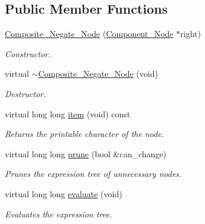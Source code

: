 \subsection*{Public Member Functions}
\begin{DoxyCompactItemize}
\item 
\hyperlink{classMadara_1_1Expression__Tree_1_1Composite__Negate__Node_a13d46a6fdcd4a5cab6b809a1220185a8}{Composite\_\-Negate\_\-Node} (\hyperlink{classMadara_1_1Expression__Tree_1_1Component__Node}{Component\_\-Node} $\ast$right)
\begin{DoxyCompactList}\small\item\em Constructor. \item\end{DoxyCompactList}\item 
virtual \hyperlink{classMadara_1_1Expression__Tree_1_1Composite__Negate__Node_aafcb6076aee4526c38b831458c3f8616}{$\sim$Composite\_\-Negate\_\-Node} (void)
\begin{DoxyCompactList}\small\item\em Destructor. \item\end{DoxyCompactList}\item 
virtual long long \hyperlink{classMadara_1_1Expression__Tree_1_1Composite__Negate__Node_a2d8c2d077cf8775ea7c31f897f522b02}{item} (void) const 
\begin{DoxyCompactList}\small\item\em Returns the printable character of the node. \item\end{DoxyCompactList}\item 
virtual long long \hyperlink{classMadara_1_1Expression__Tree_1_1Composite__Negate__Node_ad1cf0eb41e1b962483cd07a6cffa49cf}{prune} (bool \&can\_\-change)
\begin{DoxyCompactList}\small\item\em Prunes the expression tree of unnecessary nodes. \item\end{DoxyCompactList}\item 
virtual long long \hyperlink{classMadara_1_1Expression__Tree_1_1Composite__Negate__Node_a6f7fc2d58f7d2258766a8384557bac72}{evaluate} (void)
\begin{DoxyCompactList}\small\item\em Evaluates the expression tree. \item\end{DoxyCompactList}\item 

\end{DoxyCompactItemize}
